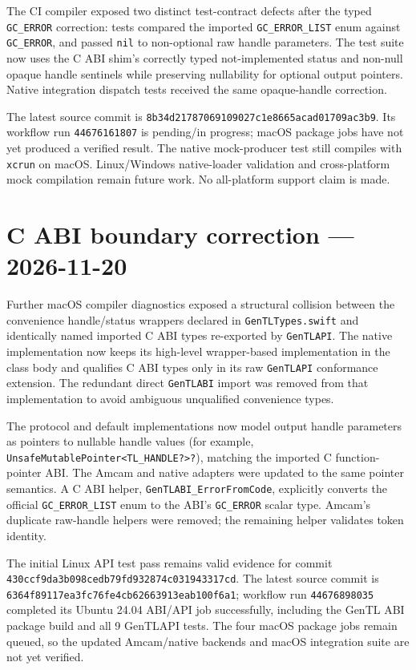 \documentclass[11pt,a4paper]{report}
\begin{document}
The CI compiler exposed two distinct test-contract defects after the typed \texttt{GC_ERROR} correction: tests compared the imported \texttt{GC_ERROR_LIST} enum against \texttt{GC_ERROR}, and passed \texttt{nil} to non-optional raw handle parameters. The test suite now uses the C ABI shim's correctly typed not-implemented status and non-null opaque handle sentinels while preserving nullability for optional output pointers. Native integration dispatch tests received the same opaque-handle correction.

The latest source commit is \texttt{8b34d21787069109027c1e8665acad01709ac3b9}. Its workflow run \texttt{44676161807} is pending/in progress; macOS package jobs have not yet produced a verified result. The native mock-producer test still compiles with \texttt{xcrun} on macOS. Linux/Windows native-loader validation and cross-platform mock compilation remain future work. No all-platform support claim is made.


\section{C ABI boundary correction --- 2026-11-20}
Further macOS compiler diagnostics exposed a structural collision between the convenience handle/status wrappers declared in \texttt{GenTLTypes.swift} and identically named imported C ABI types re-exported by \texttt{GenTLAPI}. The native implementation now keeps its high-level wrapper-based implementation in the class body and qualifies C ABI types only in its raw \texttt{GenTLAPI} conformance extension. The redundant direct \texttt{GenTLABI} import was removed from that implementation to avoid ambiguous unqualified convenience types.

The protocol and default implementations now model output handle parameters as pointers to nullable handle values (for example, \texttt{UnsafeMutablePointer<TL\_HANDLE?>?}), matching the imported C function-pointer ABI. The Amcam and native adapters were updated to the same pointer semantics. A C ABI helper, \texttt{GenTLABI\_ErrorFromCode}, explicitly converts the official \texttt{GC\_ERROR\_LIST} enum to the ABI's \texttt{GC\_ERROR} scalar type. Amcam's duplicate raw-handle helpers were removed; the remaining helper validates token identity.

The initial Linux API test pass remains valid evidence for commit \texttt{430ccf9da3b098cedb79fd932874c031943317cd}. The latest source commit is \texttt{6364f89117ea3fc76fe4cb62663913eab100f6a1}; workflow run \texttt{44676898035} completed its Ubuntu 24.04 ABI/API job successfully, including the GenTL ABI package build and all 9 GenTLAPI tests. The four macOS package jobs remain queued, so the updated Amcam/native backends and macOS integration suite are not yet verified.
\end{document}
